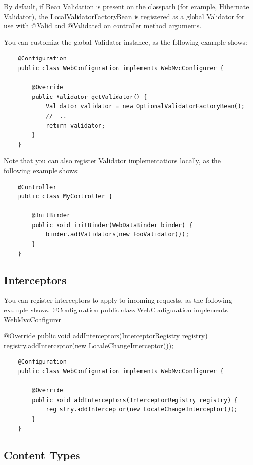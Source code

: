 \documentclass{scrartcl}
\begin{document}
By default, if Bean Validation is present on the classpath (for example, Hibernate Validator), the LocalValidatorFactoryBean is registered as a global Validator for use with @Valid and @Validated on controller method arguments.

You can customize the global Validator instance, as the following example shows:

\begin{lstlisting}
    @Configuration
    public class WebConfiguration implements WebMvcConfigurer {

        @Override
        public Validator getValidator() {
            Validator validator = new OptionalValidatorFactoryBean();
            // ...
            return validator;
        }
    }
\end{lstlisting}

Note that you can also register Validator implementations locally, as the following example shows:

\begin{lstlisting}
    @Controller
    public class MyController {

        @InitBinder
        public void initBinder(WebDataBinder binder) {
            binder.addValidators(new FooValidator());
        }
    }

\end{lstlisting}

\subsection{Interceptors}

You can register interceptors to apply to incoming requests, as the following example shows:
@Configuration
public class WebConfiguration implements WebMvcConfigurer {

    @Override
    public void addInterceptors(InterceptorRegistry registry) {
        registry.addInterceptor(new LocaleChangeInterceptor());
    }
}

\begin{lstlisting}
    @Configuration
    public class WebConfiguration implements WebMvcConfigurer {

        @Override
        public void addInterceptors(InterceptorRegistry registry) {
            registry.addInterceptor(new LocaleChangeInterceptor());
        }
    }
\end{lstlisting}

\subsection{Content Types}
\end{document}
